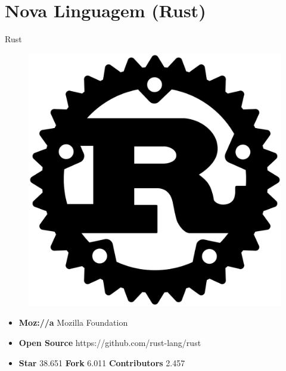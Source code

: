 \section{Nova Linguagem (Rust)}

\begin{frame}[fragile]{Rust}
\begin{figure}[ht!]
  \centering
  \includegraphics[scale=0.08]{images/rust.png}
\end{figure}
\begin{itemize}
    \item \textbf{Moz://a} Mozilla Foundation
    \item \textbf{Open Source} https://github.com/rust-lang/rust
    \item \textbf{Star} 38.651  \textbf{Fork} 6.011 \textbf{Contributors} 2.457
\end{itemize}
\end{frame}

